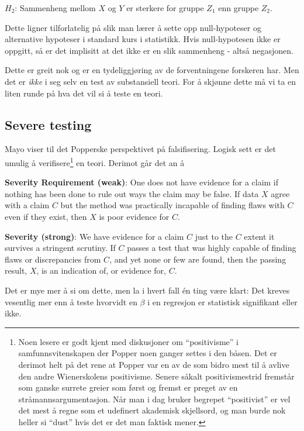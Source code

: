 \documentclass[
  letterpaper,
  DIV=11,
  numbers=noendperiod]{scrreprt}
\begin{document}
\leavevmode{}%
\(H_2\): Sammenheng mellom \(X\) og \(Y\) er sterkere for gruppe \(Z_1\)
enn gruppe \(Z_2\).

Dette ligner tilforlatelig på slik man lærer å sette opp null-hypoteser
og alternative hypoteser i standard kurs i statistikk. Hvis
null-hypotesen ikke er oppgitt, så er det implisitt at det ikke er en
slik sammenheng - altså negasjonen.

Dette er greit nok og er en tydeliggjøring av de forventningene
forskeren har. Men det er \emph{ikke} i seg selv en test av substansiell
teori. For å skjønne dette må vi ta en liten runde på hva det vil si å
teste en teori.

\hypertarget{severe-testing}{%
\subsection{Severe testing}\label{severe-testing}}

Mayo viser til det Popperske perspektivet på falsifisering. Logisk sett
er det umulig å verifisere\footnote{Noen lesere er godt kjent med
  diskusjoner om ``positivisme'' i samfunnsvitenskapen der Popper noen
  ganger settes i den båsen. Det er derimot helt på det rene at Popper
  var en av de som bidro mest til å avlive den andre Wienerskolens
  positivisme. Senere såkalt positivismestrid fremstår som ganske
  surrete greier som først og fremst er preget av en
  stråmannsargumentasjon. Når man i dag bruker begrepet ``positivist''
  er vel det mest å regne som et udefinert akademisk skjellsord, og man
  burde nok heller si ``dust'' hvis det er det man faktisk mener.} en
teori. Derimot går det an å

\leavevmode{}%
\textbf{Severity Requirement (weak)}: One does not have evidence for a
claim if nothing has been done to rule out ways the claim may be false.
If data \(X\) agree with a claim \(C\) but the method was practically
incapable of finding flaws with \(C\) even if they exist, then \(X\) is
poor evidence for \(C\).

\leavevmode{}%
\textbf{Severity (strong)}: We have evidence for a claim \(C\) just to
the \(C\) extent it survives a stringent scrutiny. If \(C\) passes a
test that was highly capable of finding flaws or discrepancies from
\(C\), and yet none or few are found, then the passing result, \(X\), is
an indication of, or evidence for, \(C\).

Det er mye mer å si om dette, men la i hvert fall én ting være klart:
Det kreves vesentlig mer enn å teste hvorvidt en \(\beta\) i en
regresjon er statistisk signifikant eller ikke.
\end{document}
